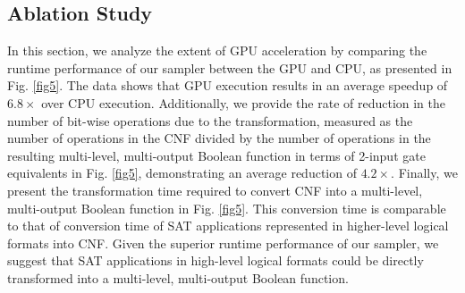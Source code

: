 \vspace{-0.2cm}
\subsection{Ablation Study}
In this section, we analyze the extent of GPU acceleration by comparing the runtime performance of our sampler between the GPU and CPU, as presented in Fig. \ref{fig5}. The data shows that GPU execution results in an average speedup of $6.8\times$ over CPU execution. Additionally, we provide the rate of reduction in the number of bit-wise operations due to the transformation, measured as the number of operations in the CNF divided by the number of operations in the resulting multi-level, multi-output Boolean function in terms of 2-input gate equivalents in Fig. \ref{fig5}, demonstrating an average reduction of $4.2\times$. Finally, we present the transformation time required to convert CNF into a multi-level, multi-output Boolean function in Fig. \ref{fig5}. This conversion time is comparable to that of conversion time of SAT applications represented in higher-level logical formats into CNF. Given the superior runtime performance of our sampler, we suggest that SAT applications in high-level logical formats could be directly transformed into a multi-level, multi-output Boolean function.


